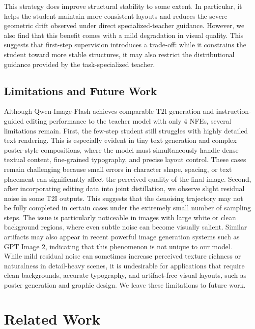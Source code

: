 \documentclass{llmxive}
\begin{document}
This strategy does improve structural stability to some extent. In particular, it helps the student maintain more consistent layouts and reduces the severe geometric drift observed under direct specialized-teacher guidance. However, we also find that this benefit comes with a mild degradation in visual quality. This suggests that first-step supervision introduces a trade-off: while it constrains the student toward more stable structures, it may also restrict the distributional guidance provided by the task-specialized teacher.

\subsection{Limitations and Future Work}

Although Qwen-Image-Flash achieves comparable T2I generation and instruction-guided editing performance to the teacher model with only $4$ NFEs, several limitations remain. First, the few-step student still struggles with highly detailed text rendering. This is especially evident in tiny text generation and complex poster-style compositions, where the model must simultaneously handle dense textual content, fine-grained typography, and precise layout control. These cases remain challenging because small errors in character shape, spacing, or text placement can significantly affect the perceived quality of the final image. Second, after incorporating editing data into joint distillation, we observe slight residual noise in some T2I outputs. This suggests that the denoising trajectory may not be fully completed in certain cases under the extremely small number of sampling steps. The issue is particularly noticeable in images with large white or clean background regions, where even subtle noise can become visually salient. Similar artifacts may also appear in recent powerful image generation systems such as GPT Image 2, indicating that this phenomenon is not unique to our model. While mild residual noise can sometimes increase perceived texture richness or naturalness in detail-heavy scenes, it is undesirable for applications that require clean backgrounds, accurate typography, and artifact-free visual layouts, such as poster generation and graphic design. We leave these limitations to future work.




\section{Related Work}
\end{document}
